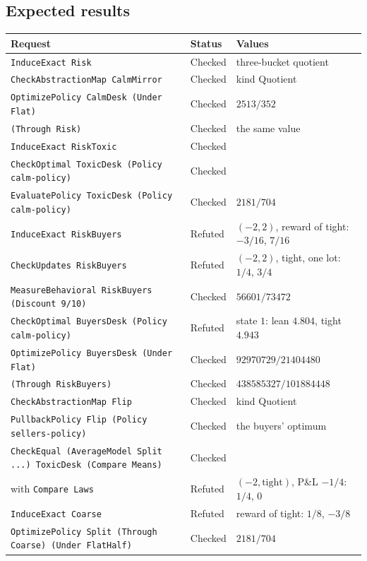 \documentclass[11pt]{article}
\newcommand{\code}[1]{\texttt{#1}}
\theoremstyle{definition}
\theoremstyle{plain}
\begin{document}
\subsection{Expected results}

\begin{longtable}{>{\raggedright\arraybackslash}p{6.4cm}l>{\raggedright\arraybackslash}p{5.1cm}}
\toprule
Request & Status & Values\\
\midrule
\endhead
\code{InduceExact Risk} & Checked & three-bucket quotient\\
\code{CheckAbstractionMap CalmMirror} & Checked & kind Quotient\\
\code{OptimizePolicy CalmDesk (Under Flat)} & Checked & $2513/352$\\
\quad \code{(Through Risk)} & Checked & the same value\\
\code{InduceExact RiskToxic} & Checked & \\
\code{CheckOptimal ToxicDesk (Policy calm-policy)} & Checked & \\
\code{EvaluatePolicy ToxicDesk (Policy calm-policy)} & Checked & $2181/704$\\
\code{InduceExact RiskBuyers} & Refuted & $(-2,2)$, reward of tight: $-3/16$, $7/16$\\
\code{CheckUpdates RiskBuyers} & Refuted & $(-2,2)$, tight, one lot: $1/4$, $3/4$\\
\code{MeasureBehavioral RiskBuyers (Discount 9/10)} & Checked & $56601/73472$\\
\code{CheckOptimal BuyersDesk (Policy calm-policy)} & Refuted & state $1$: lean $4.804$, tight $4.943$\\
\code{OptimizePolicy BuyersDesk (Under Flat)} & Checked & $92970729/21404480$\\
\quad \code{(Through RiskBuyers)} & Checked & $438585327/101884448$\\
\code{CheckAbstractionMap Flip} & Checked & kind Quotient\\
\code{PullbackPolicy Flip (Policy sellers-policy)} & Checked & the buyers' optimum\\
\code{CheckEqual (AverageModel Split ...) ToxicDesk (Compare Means)} & Checked & \\
\quad with \code{Compare Laws} & Refuted & $(-2,\text{tight})$, P\&L $-1/4$: $1/4$, $0$\\
\code{InduceExact Coarse} & Refuted & reward of tight: $1/8$, $-3/8$\\
\code{OptimizePolicy Split (Through Coarse) (Under FlatHalf)} & Checked & $2181/704$\\

\end{longtable}
\end{document}

